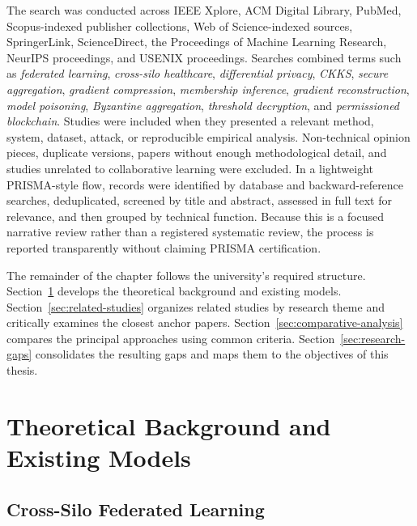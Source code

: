 The search was conducted across IEEE Xplore, ACM Digital Library, PubMed, Scopus-indexed publisher collections, Web of Science-indexed sources, SpringerLink, ScienceDirect, the Proceedings of Machine Learning Research, NeurIPS proceedings, and USENIX proceedings. Searches combined terms such as \textit{federated learning}, \textit{cross-silo healthcare}, \textit{differential privacy}, \textit{CKKS}, \textit{secure aggregation}, \textit{gradient compression}, \textit{membership inference}, \textit{gradient reconstruction}, \textit{model poisoning}, \textit{Byzantine aggregation}, \textit{threshold decryption}, and \textit{permissioned blockchain}. Studies were included when they presented a relevant method, system, dataset, attack, or reproducible empirical analysis. Non-technical opinion pieces, duplicate versions, papers without enough methodological detail, and studies unrelated to collaborative learning were excluded. In a lightweight PRISMA-style flow, records were identified by database and backward-reference searches, deduplicated, screened by title and abstract, assessed in full text for relevance, and then grouped by technical function. Because this is a focused narrative review rather than a registered systematic review, the process is reported transparently without claiming PRISMA certification.

The remainder of the chapter follows the university's required structure. Section~\ref{sec:theory} develops the theoretical background and existing models. Section~\ref{sec:related-studies} organizes related studies by research theme and critically examines the closest anchor papers. Section~\ref{sec:comparative-analysis} compares the principal approaches using common criteria. Section~\ref{sec:research-gaps} consolidates the resulting gaps and maps them to the objectives of this thesis.

\section{Theoretical Background and Existing Models}
\label{sec:theory}

\subsection{Cross-Silo Federated Learning}

